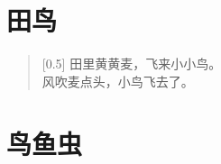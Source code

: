 \documentclass[12pt,UTF-8,openany]{ctexbook}
\begin{document}
\hanzibox{}\hanzibox{}\hanzibox{}\hanzibox{}\hspace{1em}\hanzibox{}\hanzibox{}\hanzibox{}\hanzibox{}

\hanzibox{}\hanzibox{}\hanzibox{}\hanzibox{}\hspace{1em}\hanzibox{}\hanzibox{}\hanzibox{}\hanzibox{}






\chapter{田鸟}

\begin{large}
    
    \begin{verse}[0.5\linewidth]
        田里黄黄麦，飞来小小鸟。 \\
        风吹麦点头，小鸟飞去了。
    \end{verse}
    
\end{large}


\clearpage

\begin{center}
    
    
    
\end{center}


\hanzibox{}\hanzibox{}\hanzibox{}\hanzibox{}\hspace{1em}\hanzibox{}\hanzibox{}\hanzibox{}\hanzibox{}

\hanzibox{}\hanzibox{}\hanzibox{}\hanzibox{}\hspace{1em}\hanzibox{}\hanzibox{}\hanzibox{}\hanzibox{}

\hanzibox{}\hanzibox{}\hanzibox{}\hanzibox{}\hspace{1em}\hanzibox{}\hanzibox{}\hanzibox{}\hanzibox{}

\hanzibox{}\hanzibox{}\hanzibox{}\hanzibox{}\hspace{1em}




\chapter{鸟鱼虫}
\end{document}
